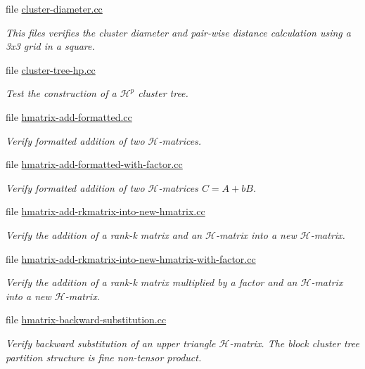 \begin{DoxyCompactItemize}
file \hyperlink{cluster-diameter_8cc}{cluster-\/diameter.\+cc}
\begin{DoxyCompactList}\small\item\em This files verifies the cluster diameter and pair-\/wise distance calculation using a 3x3 grid in a square. \end{DoxyCompactList}\item 
file \hyperlink{cluster-tree-hp_8cc}{cluster-\/tree-\/hp.\+cc}
\begin{DoxyCompactList}\small\item\em Test the construction of a $\mathcal{H}^p$ cluster tree. \end{DoxyCompactList}\item 
file \hyperlink{hmatrix-add-formatted_8cc}{hmatrix-\/add-\/formatted.\+cc}
\begin{DoxyCompactList}\small\item\em Verify formatted addition of two $\mathcal{H}$-\/matrices. \end{DoxyCompactList}\item 
file \hyperlink{hmatrix-add-formatted-with-factor_8cc}{hmatrix-\/add-\/formatted-\/with-\/factor.\+cc}
\begin{DoxyCompactList}\small\item\em Verify formatted addition of two $\mathcal{H}$-\/matrices $C = A + b B$. \end{DoxyCompactList}\item 
file \hyperlink{hmatrix-add-rkmatrix-into-new-hmatrix_8cc}{hmatrix-\/add-\/rkmatrix-\/into-\/new-\/hmatrix.\+cc}
\begin{DoxyCompactList}\small\item\em Verify the addition of a rank-\/k matrix and an $\mathcal{H}$-\/matrix into a new $\mathcal{H}$-\/matrix. \end{DoxyCompactList}\item 
file \hyperlink{hmatrix-add-rkmatrix-into-new-hmatrix-with-factor_8cc}{hmatrix-\/add-\/rkmatrix-\/into-\/new-\/hmatrix-\/with-\/factor.\+cc}
\begin{DoxyCompactList}\small\item\em Verify the addition of a rank-\/k matrix multiplied by a factor and an $\mathcal{H}$-\/matrix into a new $\mathcal{H}$-\/matrix. \end{DoxyCompactList}\item 
file \hyperlink{hmatrix-backward-substitution_8cc}{hmatrix-\/backward-\/substitution.\+cc}
\begin{DoxyCompactList}\small\item\em Verify backward substitution of an upper triangle $\mathcal{H}$-\/matrix. The block cluster tree partition structure is fine non-\/tensor product. \end{DoxyCompactList}\item 

\end{DoxyCompactItemize}
